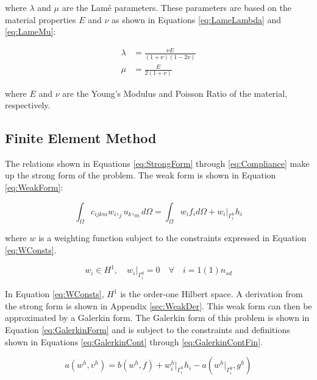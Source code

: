 \documentclass[a4paper, 12pt]{article}
\begin{document}
\noindent
where $\lambda$ and $\mu$ are the Lam\'e parameters.
These parameters are based on the material properties $E$ and $\nu$
as shown in Equations \ref{eq:LameLambda} and \ref{eq:LameMu}:

\begin{align}
\lambda &= \frac{ \nu E }{(1+\nu) (1-2\nu) }
  \label{eq:LameLambda} \\
\mu &= \frac{ E}{ 2( 1+\nu)}
  \label{eq:LameMu}
\end{align}

\noindent
where $E$ and $\nu$ are the Young's Modulus and Poisson Ratio
of the material, respectively.

\subsection{Finite Element Method} \label{subsec:fem}
The relations shown in Equations \ref{eq:StrongForm} through
\ref{eq:Compliance} make up the strong form of the problem.
The weak form is shown in Equation \ref{eq:WeakForm}:

\begin{equation} \label{eq:WeakForm}
\int_{\Omega} c_{ijkm} w_{i},_{j} u_{k},_{m} d\Omega =
  \int_{\Omega} w_{i} f_{i} d\Omega +
  w_{i}\Big|_{\Gamma^{h}_{i}} h_{i}
\end{equation}

\noindent
where $w$ is a weighting function subject to the constraints
expressed in Equation \ref{eq:WConsts}.

\begin{equation} \label{eq:WConsts}
w_{i} \in H^1,\quad w_{i}\Big|_{\Gamma^{g}_{i}} = 0
    \quad \forall \quad i=1(1)n_{sd}
\end{equation}

\noindent
In Equation \ref{eq:WConsts}, $H^{1}$ is the order-one Hilbert space.
A derivation from the strong form is shown in Appendix \ref{sec:WeakDer}.
This weak form can then be approximated by a Galerkin form. 
The Galerkin form of this problem is shown in Equation 
\ref{eq:GalerkinForm} and is subject to the constraints and definitions
shown in Equations \ref{eq:GalerkinCont}
through  \ref{eq:GalerkinContFin}.

\begin{equation} \label{eq:GalerkinForm}
a(w^{h} , v^{h})
  = b(w^{h} , f) 
  + w^{h}_{i}\Big|_{\Gamma^{h}_{i}} h_{i} 
  - a(w^{h}\Big|_{\Gamma^{g}_{i}} , g^{h})
\end{equation}
\end{document}
